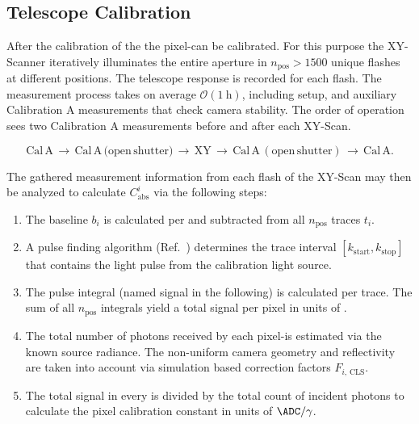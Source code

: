 \subsection{Telescope Calibration}
\label{ssec:fd-xy-calibration}

After the calibration of the \CLS the \FD pixel-\PMTs can be calibrated. For 
this purpose the XY-Scanner iteratively illuminates the entire aperture in 
$n_\mathrm{pos} > 1500$ unique flashes at different positions. The telescope 
response is recorded for each flash. The measurement process takes on average
$\mathcal{O}(\SI{1}{\hour})$, including setup, and auxiliary Calibration A 
measurements that check camera stability. The order of operation sees two 
Calibration A measurements before and after each XY-Scan.

\begin{equation*}
	\mathrm{Cal\,A}\,\rightarrow\,\mathrm{Cal\,A\,(open\,shutter})\,
	\rightarrow\,\mathrm{XY}\,\rightarrow\,\mathrm{Cal\,A\,(open\,shutter)}
	\,\rightarrow\,\mathrm{Cal\,A}.
\end{equation*}

The gathered measurement information from each flash of the XY-Scan may then be 
analyzed to calculate $C^i_\mathrm{abs}$ via the following steps:

\vspace{0.4cm}
\begin{enumerate}
	\item The baseline $b_i$ is calculated per \PMT and subtracted from all
	$n_\mathrm{pos}$ traces $t_i$.
	\item A pulse finding algorithm 
	(Ref.~\cite[][Section 7.1.1]{schaferXYScannerVersatileMethod2023}) 
	determines the trace interval $[k_\mathrm{start}, k_\mathrm{stop}]$ 
	that contains the light pulse from the calibration light source.
\item The pulse integral (named signal in the following) is calculated per 
	trace. The sum of all $n_\mathrm{pos}$ integrals yield a total signal 
	per pixel in units of \ADC.
	\item The total number of photons received by each pixel-\PMT is 
	estimated via the known source radiance. The non-uniform camera 
	geometry and reflectivity are taken into account via simulation based 
	correction factors $F_{i,\,\mathrm{CLS}}$.
	\item The total signal in every \PMT is divided by the total count of 
	incident photons to calculate the pixel calibration constant in units 
	of $\ADC/\gamma$.
\end{enumerate}
\vspace{0.3cm}

